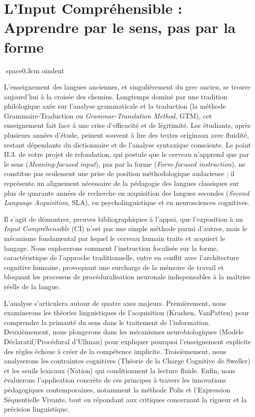

\section{L'Input Compréhensible : Apprendre par le sens, pas par la forme}
space{0.3cm}
oindent

L'enseignement des langues anciennes, et singulièrement du grec ancien, se trouve aujourd'hui à la
croisée des chemins. Longtemps dominé par une tradition philologique axée sur l'analyse grammaticale
et la traduction (la méthode Grammaire-Traduction ou \textit{Grammar-Translation Method}, GTM), cet
enseignement fait face à une crise d'efficacité et de légitimité. Les étudiants, après plusieurs
années d'étude, peinent souvent à lire des textes originaux avec fluidité, restant dépendants du
dictionnaire et de l'analyse syntaxique consciente. Le point II.3.\cite{II-3-3-ref3} de votre projet
de refondation, qui postule que \og le cerveau n'apprend que par le sens (\textit{Meaning-focused
input}), pas par la forme (\textit{Form-focused instruction})\fg{}, ne constitue pas seulement une
prise de position méthodologique audacieuse ; il représente un alignement nécessaire de la pédagogie
des langues classiques sur plus de quarante années de recherche en acquisition des langues secondes
(\textit{Second Language Acquisition}, SLA), en psycholinguistique et en neurosciences cognitives.

Il s'agit de démontrer, preuves bibliographiques à l'appui, que l'exposition
à un \textit{Input Compréhensible} (CI) n'est pas une simple méthode parmi d'autres, mais le
mécanisme fondamental par lequel le cerveau humain traite et acquiert le langage. Nous explorerons
comment l'instruction focalisée sur la forme, caractéristique de l'approche traditionnelle, entre en
conflit avec l'architecture cognitive humaine, provoquant une surcharge de la mémoire de travail et
bloquant les processus de procéduralisation neuronale indispensables à la maîtrise réelle de la
langue.

L'analyse s'articulera autour de quatre axes majeurs. Premièrement, nous examinerons les théories
linguistiques de l'acquisition (Krashen, VanPatten) pour comprendre la primauté du sens dans le
traitement de l'information. Deuxièmement, nous plongerons dans les mécanismes neurobiologiques
(Modèle Déclaratif/Procédural d'Ullman) pour expliquer pourquoi l'enseignement explicite des règles
échoue à créer de la compétence implicite. Troisièmement, nous analyserons les contraintes
cognitives (Théorie de la Charge Cognitive de Sweller) et les seuils lexicaux (Nation) qui
conditionnent la lecture fluide. Enfin, nous évaluerons l'application concrète de ces principes à
travers les innovations pédagogiques contemporaines, notamment la méthode Polis et l'Expression
Séquentielle Vivante, tout en répondant aux critiques concernant la rigueur et la précision
linguistique.



